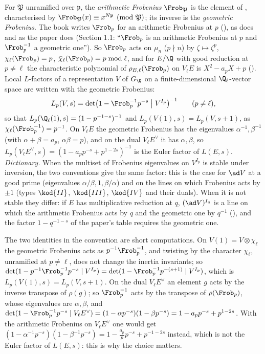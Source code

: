 \begin{convention}\label{conv:ant:frobenius}
For $\mathfrak P$ unramified over $\mathfrak p$, the \emph{arithmetic Frobenius} $\Frob_{\mathfrak P}$ is the element of , characterised
by $\Frob_{\mathfrak P}(x)\equiv x^{N\mathfrak p}\pmod{\mathfrak P}$; its inverse is the \emph{geometric Frobenius}. The book writes $\Frob_p$ for an
arithmetic Frobenius at $p$ (), as  does and as the paper does (Section 1.1: ``$\Frob_p$ is an arithmetic Frobenius
at $p$ and $\Frob_p^{-1}$ a geometric one''). So $\Frob_p$ acts on $\mu_n$ ($p\nmid n$) by $\zeta\mapsto\zeta^p$, $\chi_\ell(\Frob_p)=p$,
$\bar\chi_\ell(\Frob_p)=p\bmod\ell$, and for $E/\Q$ with good reduction at $p\ne\ell$ the characteristic polynomial of $\rho_{E,\ell}(\Frob_p)$ on $V_\ell E$ is
$X^2-a_pX+p$ (). Local $L$-factors of a representation $V$ of $G_\Q$ on a finite-dimensional $\Q_\ell$-vector space are
written with the geometric Frobenius:
\[
L_p(V,s)=\det\bigl(1-\Frob_p^{-1}p^{-s}\bigm|V^{I_p}\bigr)^{-1}\qquad(p\ne\ell),
\]
so that $L_p(\Q_\ell(1),s)=(1-p^{-1-s})^{-1}$ and $L_p(V(1),s)=L_p(V,s+1)$, as $\chi_\ell(\Frob_p^{-1})=p^{-1}$. On $V_\ell E$ the geometric Frobenius has the
eigenvalues $\alpha^{-1},\beta^{-1}$ (with $\alpha+\beta=a_p$, $\alpha\beta=p$), and on the dual $V_\ell E^\vee$ it has $\alpha,\beta$, so
$L_p(V_\ell E^\vee,s)=(1-a_pp^{-s}+p^{1-2s})^{-1}$ is the Euler factor of $L(E,s)$. \emph{Dictionary.} When the multiset of Frobenius eigenvalues on
$V^{I_p}$ is stable under inversion, the two conventions give the same factor: this is the case for $\ad V$ at a good prime (eigenvalues
$\alpha/\beta,1,\beta/\alpha$) and on the lines on which Frobenius acts by $\pm1$ (types $\kod{II}$, $\kod{III}$, $\kod{IV}$ and their duals). When it is not
stable they differ: if $E$ has multiplicative reduction at $q$, $(\ad V)^{I_q}$ is a line on which the arithmetic Frobenius acts by $q$ and the geometric one by
$q^{-1}$ (), and the factor $1-q^{-1-s}$ of the paper's table requires the geometric one.
\end{convention}

The two identities in the convention are short computations. On $V(1)=V\otimes\chi_\ell$ the geometric Frobenius acts as $p^{-1}\Frob_p^{-1}$, and twisting by the
character $\chi_\ell$, unramified at $p\ne\ell$, does not change the inertia invariants; so
$\det(1-p^{-1}\Frob_p^{-1}p^{-s}\mid V^{I_p})=\det(1-\Frob_p^{-1}p^{-(s+1)}\mid V^{I_p})$, which is $L_p(V(1),s)=L_p(V,s+1)$. On the dual $V_\ell E^\vee$ an element $g$
acts by the inverse transpose of $\rho(g)$; so $\Frob_p^{-1}$ acts by the transpose of $\rho(\Frob_p)$, whose eigenvalues are $\alpha,\beta$, and
$\det(1-\Frob_p^{-1}p^{-s}\mid V_\ell E^\vee)=(1-\alpha p^{-s})(1-\beta p^{-s})=1-a_pp^{-s}+p^{1-2s}$. With the arithmetic Frobenius on $V_\ell E^\vee$ one would get
$(1-\alpha^{-1}p^{-s})(1-\beta^{-1}p^{-s})=1-\frac{a_p}pp^{-s}+p^{-1-2s}$ instead, which is not the Euler factor of $L(E,s)$: this is why the choice matters.

